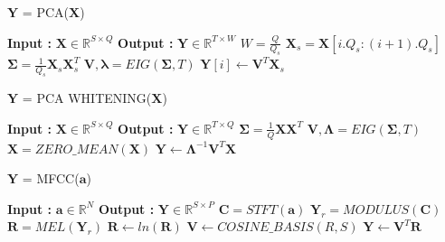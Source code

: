 \begin{algorithm}
  \caption{$\textbf{Y}$ = PCA($\textbf{X}$)}\label{PCA}
  \begin{algorithmic}[1]
    \Statex \textbf{Input :} $\textbf{X} \in \mathbb{R}^{S \times Q}$
    \Statex \textbf{Output :} $\textbf{Y} \in \mathbb{R}^{T \times W}$
    \State  $W = \frac{Q}{Q_{s}}$
    \State $\textbf{X}_{s} = \textbf{X}[i.Q_{s}:(i+1).Q_{s}]$ 
      \State $\bm{\Sigma} = \frac{1}{Q_{s}}\textbf{X}_{s}\textbf{X}_{s}^{T}$ 
      \State $\textbf{V}, \bm{\lambda} = EIG(\bm{\Sigma}, T)$ 
      \State $\textbf{Y}[i] \leftarrow \textbf{V}^{T}\textbf{X}_{s}$
    \EndFor
  \end{algorithmic}
\end{algorithm}
\bigskip


\begin{algorithm}
  \caption{$\textbf{Y}$ = PCA WHITENING($\textbf{X}$) }\label{PCA_W}
  \begin{algorithmic}[1]
    \Statex \textbf{Input :} $\textbf{X} \in \mathbb{R}^{S \times Q}$
    \Statex \textbf{Output :} $\textbf{Y} \in \mathbb{R}^{T \times Q}$ 
      \State $\bm{\Sigma} = \frac{1}{Q}\textbf{X}\textbf{X}^{T}$ 
      \State $\textbf{V}, \bm{\Lambda} = EIG(\bm{\Sigma}, T)$ 
      \State $\textbf{\^{X}} = ZERO\_MEAN(\textbf{X})$
      \State $\textbf{Y} \leftarrow \bm{\Lambda}^{-1}\textbf{V}^{T}\textbf{\^{X}}$
  \end{algorithmic}
\end{algorithm}
\bigskip


\begin{algorithm}
  \caption{$\textbf{Y}$ = MFCC($\textbf{a}$) }\label{MFCC}
  \begin{algorithmic}[1]
    \Statex \textbf{Input :} $\textbf{a} \in \mathbb{R}^{N}$
    \Statex \textbf{Output :} $\textbf{Y} \in \mathbb{R}^{S \times P}$ 
    \State $\textbf{C} = STFT(\textbf{a})$ 
    \State $\textbf{Y}_{r} = MODULUS(\textbf{C})$ 
    \State $\textbf{R} = MEL(\textbf{Y}_{r})$ 
    \State $\textbf{R} \leftarrow ln(\textbf{R})$
    \State $\textbf{V} \leftarrow COSINE\_BASIS(R,S)$  
    \State $\textbf{Y} \leftarrow \textbf{V}^{T}\textbf{R}$
  \end{algorithmic}
\end{algorithm}
 
